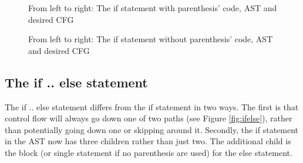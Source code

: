 \begin{figure}
\centering
\begin{minipage}{.3\textwidth}
  \centering
  
\end{minipage}%
\begin{minipage}{.3\textwidth}
  \centering
\end{minipage}
\begin{minipage}{.3\textwidth}
  \centering
\end{minipage}
\caption{From left to right: The if statement with parenthesis' code, AST and desired CFG}
\label{fig:if}
\end{figure}

\begin{figure}
\centering
\begin{minipage}{.3\textwidth}
  \centering
  
\end{minipage}%
\begin{minipage}{.3\textwidth}
  \centering
\end{minipage}
\begin{minipage}{.3\textwidth}
  \centering
\end{minipage}
\caption{From left to right: The if statement without parenthesis' code, AST and desired CFG}
\label{fig:ifnoparen}
\end{figure}

\subsection{The if .. else statement}

The if .. else statement differs from the if statement in two ways. The first is that control flow will always go down one of two paths (see Figure \ref{fig:ifelse}), rather than potentially going down one or skipping around it. Secondly, the if statement in the AST now has three children rather than just two. The additional child is the block (or single statement if no parenthesis are used) for the else statement.

